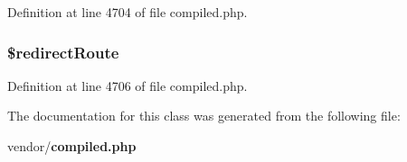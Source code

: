 Definition at line 4704 of file compiled.\+php.

\subsubsection[{\$redirect\+Route}]{\setlength{\rightskip}{0pt plus 5cm}\$redirect\+Route\hspace{0.3cm}{\ttfamily [protected]}}\label{class_illuminate_1_1_foundation_1_1_validation_1_1_form_request_ad8d0c35e04f5f509e1ec1daf00b5209a}


Definition at line 4706 of file compiled.\+php.



The documentation for this class was generated from the following file\+:\begin{DoxyCompactItemize}
\item 
vendor/{\bf compiled.\+php}\end{DoxyCompactItemize}
